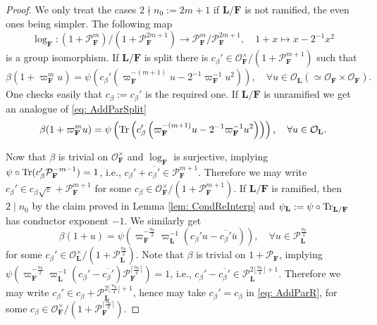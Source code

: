 \documentclass[A4]{amsart}
\numberwithin{equation}{section} \everymath{\displaystyle}
\newcommand{\Tr}{{\rm Tr}}
\newcommand{\F}{\mathbf{F}}
\newcommand{\bL}{\mathbf{L}}
\newcommand{\vO}{\mathcal{O}}
\newcommand{\vP}{\mathcal{P}}
\begin{document}
\begin{proof}
	We only treat the cases $2 \nmid n_0 := 2m+1$ if $\bL/\F$ is not ramified, the even ones being simpler. The following map
	$$ \log_{\F} : (1+\vP_{\F}^m) / (1+\vP_{\F}^{2m+1}) \to \vP_{\F}^m/\vP_{\F}^{2m+1}, \quad 1+x \mapsto x - 2^{-1} x^2 $$
	is a group isomorphism. If $\bL/\F$ is split there is $c_{\beta}' \in \vO_{\F}^{\times}/(1+\vP_{\F}^{m+1})$ such that
\begin{equation} \label{eq: AddParSplit}
	\beta(1+\varpi_{\F}^m u) = \psi \left( c_{\beta}' \left( \varpi_{\F}^{-(m+1)} u - 2^{-1} \varpi_{\F}^{-1} u^2 \right) \right), \quad \forall u \in \vO_{\bL} \left( \simeq \vO_{\F} \times \vO_{\F} \right). 
\end{equation}
	One checks easily that $c_{\beta} := c_{\beta}'$ is the required one. If $\bL/\F$ is unramified we get an analogue of \eqref{eq: AddParSplit}
\begin{equation} \label{eq: AddParUnr}
	\beta(1+\varpi_{\F}^m u) = \psi \left( \Tr \left( c_{\beta}' \left( \varpi_{\F}^{-(m+1)} u - 2^{-1} \varpi_{\F}^{-1} u^2 \right) \right) \right), \quad \forall u \in \vO_{\bL}. 
\end{equation}

\noindent Now that $\beta$ is trivial on $\vO_{\F}^{\times}$ and $\log_{\F}$ is surjective, implying $\psi \circ \Tr(c_{\beta}' \vP_{\F}^{-m-1}) = 1$, i.e., $c_{\beta}' + \overline{c_{\beta}'} \in \vP_{\F}^{m+1}$. Therefore we may write $c_{\beta}' \in c_{\beta} \sqrt{\varepsilon} + \vP_{\F}^{m+1}$ for some $c_{\beta} \in \vO_{\F}^{\times}/(1+\vP_{\F}^{m+1})$. If $\bL/\F$ is ramified, then $2 \mid n_0$ by the claim proved in Lemma \ref{lem: CondReInterp} and $\psi_{\bL} := \psi \circ \Tr_{\bL/\F}$ has conductor exponent $-1$. We similarly get
\begin{equation} \label{eq: AddParR}
	\beta(1+u) = \psi \left( \varpi_{\F}^{-\frac{n_0}{2}} \varpi_{\bL}^{-1} (c_{\beta}' u - \overline{c_{\beta}'} \bar{u}) \right), \quad \forall u \in \vP_{\bL}^{\frac{n_0}{2}} 
\end{equation}
	for some $c_{\beta}' \in \vO_{\bL}^{\times}/(1+\vP_{\bL}^{\frac{n_0}{2}})$. Note that $\beta$ is trivial on $1+\vP_{\F}$, implying $\psi \left( \varpi_{\F}^{-\frac{n_0}{2}} \varpi_{\bL}^{-1} (c_{\beta}' - \overline{c_{\beta}'}) \vP_{\F}^{\lceil \frac{n_0}{4} \rceil} \right) = 1$,  i.e., $c_{\beta}' - \overline{c_{\beta}'} \in \vP_{\bL}^{2 \lfloor \frac{n_0}{4} \rfloor+1}$. Therefore we may write $c_{\beta}' \in c_{\beta} + \vP_{\bL}^{2 \lfloor \frac{n_0}{4} \rfloor+1}$, hence may take $c_{\beta}'=c_{\beta}$ in \eqref{eq: AddParR}, for some $c_{\beta} \in \vO_{\F}^{\times}/(1+\vP_{\F}^{\lceil \frac{n_0}{4} \rceil})$.
 \end{proof}
 
\end{document}
